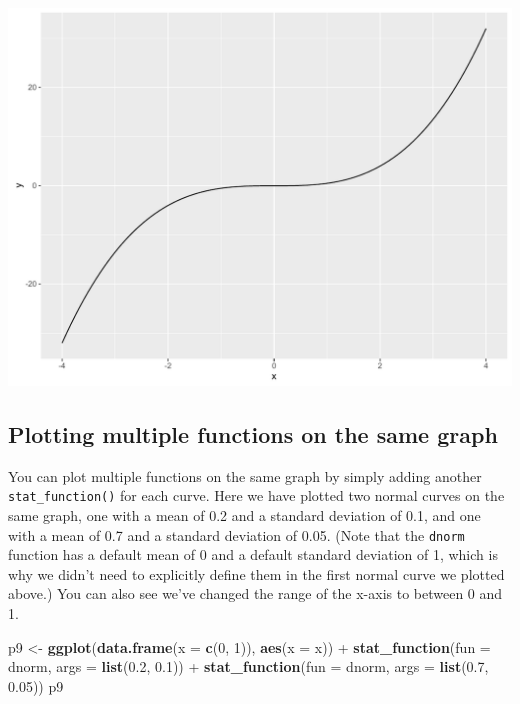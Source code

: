 \documentclass[]{article}
\newenvironment{Shaded}{\begin{snugshade}}{\end{snugshade}}
\newcommand{\KeywordTok}[1]{\textcolor[rgb]{0.13,0.29,0.53}{\textbf{{#1}}}}
\newcommand{\DataTypeTok}[1]{\textcolor[rgb]{0.13,0.29,0.53}{{#1}}}
\newcommand{\DecValTok}[1]{\textcolor[rgb]{0.00,0.00,0.81}{{#1}}}
\newcommand{\FloatTok}[1]{\textcolor[rgb]{0.00,0.00,0.81}{{#1}}}
\newcommand{\StringTok}[1]{\textcolor[rgb]{0.31,0.60,0.02}{{#1}}}
\newcommand{\NormalTok}[1]{{#1}}
\begin{document}
\begin{center}\includegraphics{0_all_posts_pdf/function_3-1} \end{center}

\subsection{Plotting multiple functions on the same
graph}\label{plotting-multiple-functions-on-the-same-graph}

You can plot multiple functions on the same graph by simply adding
another \texttt{stat\_function()} for each curve. Here we have plotted
two normal curves on the same graph, one with a mean of 0.2 and a
standard deviation of 0.1, and one with a mean of 0.7 and a standard
deviation of 0.05. (Note that the \texttt{dnorm} function has a default
mean of 0 and a default standard deviation of 1, which is why we didn't
need to explicitly define them in the first normal curve we plotted
above.) You can also see we've changed the range of the x-axis to
between 0 and 1.

\begin{Shaded}
\begin{Highlighting}[]
\NormalTok{p9 <-}\StringTok{ }\KeywordTok{ggplot}\NormalTok{(}\KeywordTok{data.frame}\NormalTok{(}\DataTypeTok{x =} \KeywordTok{c}\NormalTok{(}\DecValTok{0}\NormalTok{, }\DecValTok{1}\NormalTok{)), }\KeywordTok{aes}\NormalTok{(}\DataTypeTok{x =} \NormalTok{x)) +}
\StringTok{      }\KeywordTok{stat_function}\NormalTok{(}\DataTypeTok{fun =} \NormalTok{dnorm, }\DataTypeTok{args =} \KeywordTok{list}\NormalTok{(}\FloatTok{0.2}\NormalTok{, }\FloatTok{0.1}\NormalTok{)) +}
\StringTok{      }\KeywordTok{stat_function}\NormalTok{(}\DataTypeTok{fun =} \NormalTok{dnorm, }\DataTypeTok{args =} \KeywordTok{list}\NormalTok{(}\FloatTok{0.7}\NormalTok{, }\FloatTok{0.05}\NormalTok{))}
\NormalTok{p9}
\end{Highlighting}
\end{Shaded}
\end{document}

